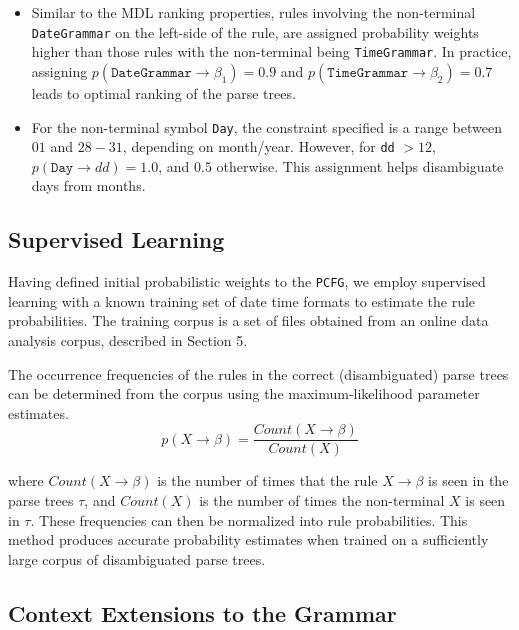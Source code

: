 \begin{itemize}
\setlength\itemsep{0em}
\item Similar to the MDL ranking properties, rules involving the non-terminal \texttt{DateGrammar} on the left-side of the rule, are assigned probability weights higher than those rules with the non-terminal being \texttt{TimeGrammar}. In practice, assigning $p(\texttt{DateGrammar} \rightarrow \beta_{1}) = 0.9$ and $p(\texttt{TimeGrammar} \rightarrow \beta_{2}) = 0.7$ leads to optimal ranking of the parse trees.

\item For the non-terminal symbol \texttt{Day}, the constraint specified is a range between $01$ and $28-31$, depending on month/year. However, for \texttt{dd} $> 12$, $p(\texttt{Day} \rightarrow d d) = 1.0$, and $0.5$ otherwise. This assignment helps disambiguate days from months.




\end{itemize}

\subsection{Supervised Learning}

Having defined initial probabilistic weights to the \texttt{PCFG}, we employ supervised learning with a known training set of date time formats to estimate the rule probabilities.  The training corpus is a set of files obtained from an online data analysis corpus, described in Section 5.

The occurrence frequencies of the rules in the correct
(disambiguated) parse trees can be determined from the corpus using the maximum-likelihood parameter estimates.
\begin{equation}
p(X \rightarrow \beta) = \frac{Count(X \rightarrow \beta)}{Count(X)}
\end{equation}

where $Count(X \rightarrow \beta)$ is the number of times that the rule $X \rightarrow \beta$ is seen in
the parse trees $\tau$, and $Count(X)$ is the number of times the non-terminal $X$ is seen in $\tau$. These frequencies can then be normalized into rule probabilities. This method produces accurate probability estimates when trained on a sufficiently large corpus of disambiguated parse trees. 

\subsection{Context Extensions to the Grammar}

